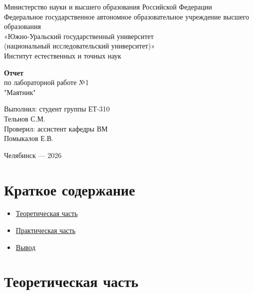 \documentclass[a4paper]{article}
\newcommand{\mainsection}[1]{%
    \phantomsection
    \section*{\centering\fontsize{16pt}{19pt}\selectfont\textbf{#1}}%
}
\begin{document}
\begin{titlepage}
    \centering
    Министерство науки и высшего образования Российской Федерации\\[0.2cm]
    Федеральное государственное автономное образовательное учреждение высшего образования\\[0.2cm]
    «Южно-Уральский государственный университет\\(национальный исследовательский университет)»\\[0.2cm]
    Институт естественных и точных наук

    \vspace{4cm}

    {\bfseries Отчет}\\[0.3cm]
    по лабораторной работе №1\\[0.3cm]
    "Маятник"

    \vspace{4cm}

    \raggedleft
    \begin{minipage}{0.48\textwidth}
        \raggedright
        Выполнил: студент группы ЕТ-310\\
        Тельнов С.М.\\[0.3cm]
        Проверил: ассистент кафедры ВМ\\
        Помыкалов Е.В.
    \end{minipage}

    \vfill

    \centering
    Челябинск — 2026
\end{titlepage}

\setlength{\parindent}{1.5em}

\section*{\centering Краткое содержание}
\begin{itemize}
    \setlength{\itemsep}{0.4cm}
    \item \hyperref[sec:theory]{Теоретическая часть \dotfill \pageref{sec:theory}}
    \item \hyperref[sec:practice]{Практическая часть \dotfill \pageref{sec:practice}}
    \item \hyperref[sec:conclusion]{Вывод \dotfill \pageref{sec:conclusion}}
\end{itemize}

\newpage

\mainsection{Теоретическая часть}
\label{sec:theory}
\end{document}
